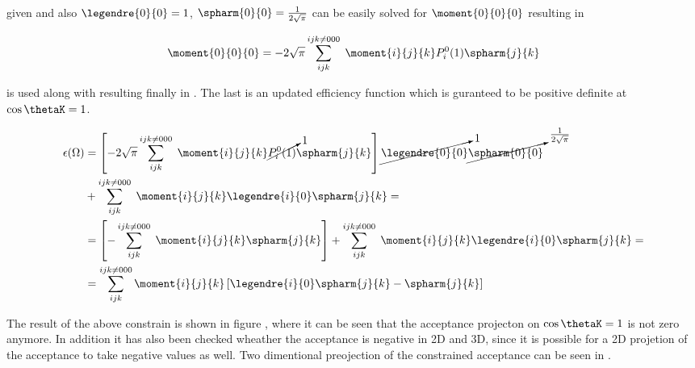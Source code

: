 \noindent given  and also $\legendre{0}{0}=1$,  $\spharm{0}{0} = \frac{1}{2\sqrt{\pi}}$  can be 
easily solved for $\moment{0}{0}{0}$ resulting in 

\begin{center}
\begin{equation}
  \moment{0}{0}{0} = -2\sqrt{\pi} \sum_{ijk}^{ijk\neq 000} \; \moment{i}{j}{k} P_i^0(1) \spharm{j}{k}
  \label{eff_constr_mom}
\end{equation}
\end{center}

\noindent {} is used along with  resulting finally in . 
The last is an updated efficiency function which is guranteed to be positive definite at $\cos\thetaK=1$. 

\begin{center}
\begin{align}
  \epsilon(\Omega) &= \left[-2\sqrt{\pi} \sum_{ijk}^{ijk\neq 000} \; \moment{i}{j}{k} \cancelto{1}{P_i^0(1)} \spharm{j}{k} \right] \cancelto{1}{\legendre{0}{0}} \cancelto{\frac{1}{2\sqrt{\pi}}}{\spharm{0}{0}} \nonumber \\ 
                   &+ \sum_{ijk}^{ijk\neq 000} \; \moment{i}{j}{k} \legendre{i}{0} \spharm{j}{k} = \nonumber \\
                   &= \left[- \sum_{ijk}^{ijk\neq 000} \; \moment{i}{j}{k} \spharm{j}{k} \right] + \sum_{ijk}^{ijk\neq 000} \; \moment{i}{j}{k} \legendre{i}{0} \spharm{j}{k} = \nonumber\\
                   &= \sum_{ijk}^{ijk\neq 000} \moment{i}{j}{k} \left[ \legendre{i}{0} \spharm{j}{k} - \spharm{j}{k} \right]
  \label{eff_func_final}
\end{align}
\end{center}

\noindent The result of the above constrain is shown in figure \figref{}, where it can be seen that the acceptance projecton on $\cos\thetaK=1$
is not zero anymore. In addition it has also been checked wheather the acceptance is negative in 2D and 3D, since it is possible for a 2D
projetion of the acceptance to take negative values as well. Two dimentional preojection of the constrained acceptance can be seen in \figref{}.

